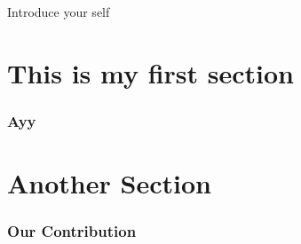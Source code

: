 

\Beamertrue 







\begin{frame}
    \titlepage
    
    \begin{note}
        {Introduce your self}
    \end{note}

\end{frame}

\section{This is my first section}
\begin{frame}
	\frametitle{Ayy}
\end{frame}

\section{Another Section}
\begin{frame}
	\frametitle{Our Contribution}
\end{frame}

